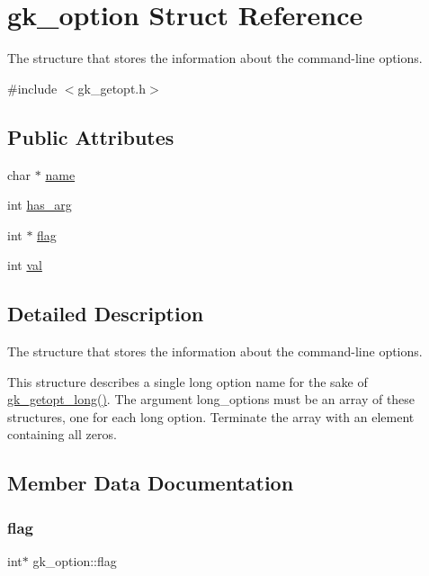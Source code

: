 \hypertarget{structgk__option}{}\section{gk\+\_\+option Struct Reference}
\label{structgk__option}


The structure that stores the information about the command-\/line options.  




{\ttfamily \#include $<$gk\+\_\+getopt.\+h$>$}

\subsection*{Public Attributes}
\begin{DoxyCompactItemize}
\item 
char $\ast$ \hyperlink{structgk__option_aa47d0e4e90d3cd1793fc5344b1e99afc}{name}
\item 
int \hyperlink{structgk__option_a66d2ab88446836cef777d756098151f5}{has\+\_\+arg}
\item 
int $\ast$ \hyperlink{structgk__option_ae9e56a3e65a631de45dd019a07c621b4}{flag}
\item 
int \hyperlink{structgk__option_abf964c7489d269515ec8e5e62b2164ba}{val}
\end{DoxyCompactItemize}


\subsection{Detailed Description}
The structure that stores the information about the command-\/line options. 

This structure describes a single long option name for the sake of \hyperlink{getopt_8c_a1c3b8d80bd9620dc66f24d4854c0f6d3}{gk\+\_\+getopt\+\_\+long()}. The argument {\ttfamily long\+\_\+options} must be an array of these structures, one for each long option. Terminate the array with an element containing all zeros. 

\subsection{Member Data Documentation}
\mbox{\label{structgk__option_ae9e56a3e65a631de45dd019a07c621b4}} 
\subsubsection{\texorpdfstring{flag}{flag}}
{\footnotesize\ttfamily int$\ast$ gk\+\_\+option\+::flag}

